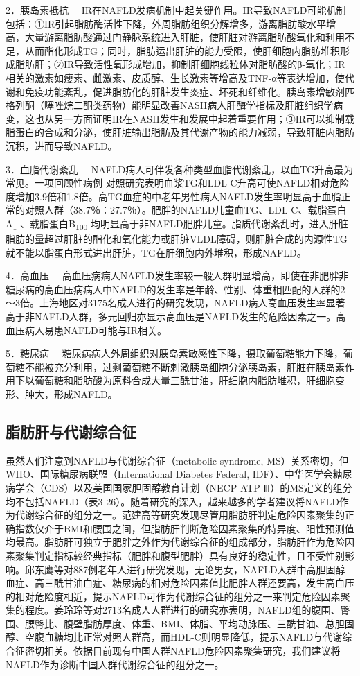 {2．胰岛素抵抗}
　IR在NAFLD发病机制中起关键作用。IR导致NAFLD可能机制包括：①IR引起脂肪酶活性下降，外周脂肪组织分解增多，游离脂肪酸水平增高，大量游离脂肪酸通过门静脉系统进入肝脏，使肝脏对游离脂肪酸氧化和利用不足，从而酯化形成TG；同时，脂肪运出肝脏的能力受限，使肝细胞内脂肪堆积形成脂肪肝；②IR导致活性氧形成增加，抑制肝细胞线粒体对脂肪酸的β-氧化；IR相关的激素如瘦素、雌激素、皮质醇、生长激素等增高及TNF-α等表达增加，使代谢和免疫功能紊乱，促进脂肪化的肝脏发生炎症、坏死和纤维化。胰岛素增敏剂匹格列酮（噻唑烷二酮类药物）能明显改善NASH病人肝酶学指标及肝脏组织学病变，这也从另一方面证明IR在NASH发生和发展中起着重要作用；③IR可以抑制载脂蛋白的合成和分泌，使肝脏输出脂肪及其代谢产物的能力减弱，导致肝脏内脂肪沉积，进而导致NAFLD。

{3．血脂代谢紊乱}
　NAFLD病人可伴发各种类型血脂代谢紊乱，以血TG升高最为常见。一项回顾性病例-对照研究表明血浆TG和LDL-C升高可使NAFLD相对危险度增加3.9倍和1.8倍。高TG血症的中老年男性病人NAFLD发生率明显高于血脂正常的对照人群（38.7％：27.7％）。肥胖的NAFLD儿童血TG、LDL-C、载脂蛋白A\textsubscript{1}
、载脂蛋白B\textsubscript{100}
均明显高于非NAFLD肥胖儿童。脂质代谢紊乱时，进入肝脏脂肪的量超过肝脏的酯化和氧化能力或肝脏VLDL障碍，则肝脏合成的内源性TG就不能以脂蛋白形式进出肝脏，TG在肝细胞内外堆积，形成NAFLD。

{4．高血压}
　高血压病病人NAFLD发生率较一般人群明显增高，即使在非肥胖非糖尿病的高血压病病人中NAFLD的发生率是年龄、性别、体重相匹配的人群的2～3倍。上海地区对3175名成人进行的研究发现，NAFLD病人高血压发生率显著高于非NAFLD人群，多元回归亦显示高血压是NAFLD发生的危险因素之一。高血压病人易患NAFLD可能与IR相关。

{5．糖尿病}
　糖尿病病人外周组织对胰岛素敏感性下降，摄取葡萄糖能力下降，葡萄糖不能被充分利用，过剩葡萄糖不断刺激胰岛细胞分泌胰岛素，肝脏在胰岛素作用下以葡萄糖和脂肪酸为原料合成大量三酰甘油，肝细胞内脂肪堆积，肝细胞变形、肿大，形成NAFLD。

\hypertarget{text00004.htmlux5cux23mllj31}{%
\subsection{脂肪肝与代谢综合征}\label{text00004.htmlux5cux23mllj31}}

虽然人们注意到NAFLD与代谢综合征（metabolic syndrome,
MS）关系密切，但WHO、国际糖尿病联盟（International Diabetes Federal,
IDF）、中华医学会糖尿病学会（CDS）以及美国国家胆固醇教育计划（NECP-ATP
Ⅲ）的MS定义的组分均不包括NAFLD（表3-26）。随着研究的深入，越来越多的学者建议将NAFLD作为代谢综合征的组分之一。范建高等研究发现尽管用脂肪肝判定危险因素聚集的正确指数仅介于BMI和腰围之间，但脂肪肝判断危险因素聚集的特异度、阳性预测值均最高。脂肪肝可独立于肥胖之外作为代谢综合征的组成部分，脂肪肝作为危险因素聚集判定指标较经典指标（肥胖和腹型肥胖）具有良好的稳定性，且不受性别影响。邱东鹰等对887例老年人进行研究发现，无论男女，NAFLD人群中高胆固醇血症、高三酰甘油血症、糖尿病的相对危险因素值比肥胖人群还要高，发生高血压的相对危险度相近，提示NAFLD可作为代谢综合征的组分之一来判定危险因素聚集的程度。姜玲玲等对2713名成人人群进行的研究亦表明，NAFLD组的腹围、臀围、腰臀比、腹壁脂肪厚度、体重、BMI、体脂、平均动脉压、三酰甘油、总胆固醇、空腹血糖均比正常对照人群高，而HDL-C则明显降低，提示NAFLD与代谢综合征密切相关。依据目前现有中国人群NAFLD危险因素聚集研究，我们建议将NAFLD作为诊断中国人群代谢综合征的组分之一。

